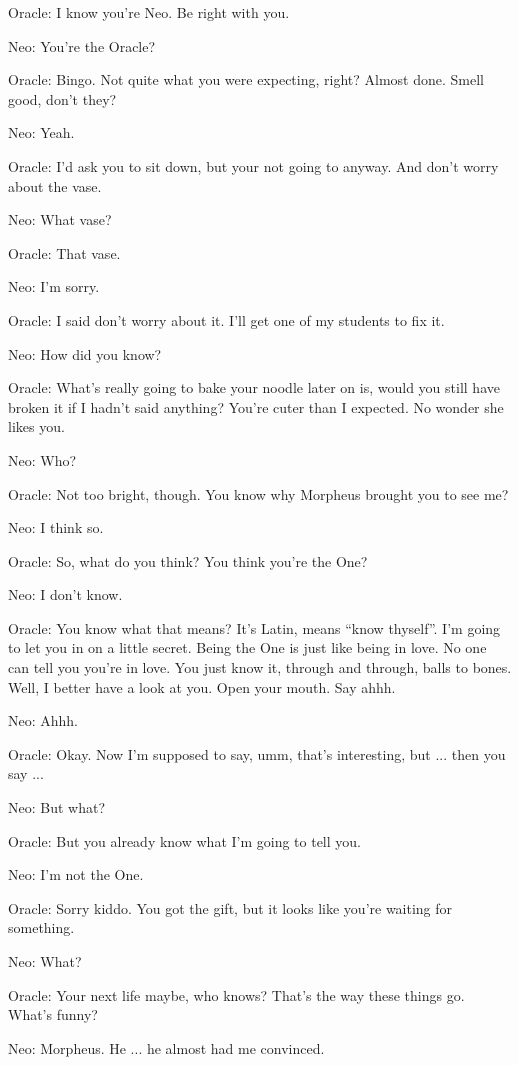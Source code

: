 \documentclass[UTF8]{ctexart}
\newenvironment{myquote}{\color{green} \setlength{\leftskip}{6em} \setlength{\rightskip}{4em} \setlength{\parindent}{-2em}}{\par}
\begin{document}
\begin{myquote}
Oracle: I know you're Neo. Be right with you.

Neo: You're the Oracle?

Oracle: Bingo. Not quite what you were expecting, right? Almost done. Smell good, don't they?

Neo: Yeah.

Oracle: I'd ask you to sit down, but your not going to anyway. And don't worry about the vase.

Neo: What vase?

Oracle: That vase.

Neo: I'm sorry.

Oracle: I said don't worry about it. I'll get one of my students to fix it.

Neo: How did you know?

Oracle: What's really going to bake your noodle later on is, would you still have broken it if I hadn't said anything? You're cuter than I expected. No wonder she likes you.

Neo: Who?

Oracle: Not too bright, though. You know why Morpheus brought you to see me?

Neo: I think so.

Oracle: So, what do you think? You think you're the One?

Neo: I don't know.

Oracle: You know what that means? It's Latin, means ``know thyself''. I'm going to let you in on a little secret. Being the One is just like being in love. No one can tell you you're in love. You just know it, through and through, balls to bones. Well, I better have a look at you. Open your mouth. Say ahhh.

Neo: Ahhh.

Oracle: Okay. Now I'm supposed to say, umm, that's interesting, but ... then you say ...

Neo: But what?

Oracle: But you already know what I'm going to tell you.

Neo: I'm not the One.

Oracle: Sorry kiddo. You got the gift, but it looks like you're waiting for something.

Neo: What?

Oracle: Your next life maybe, who knows? That's the way these things go. What's funny?

Neo: Morpheus. He ... he almost had me convinced.


\end{myquote}
\end{document}
